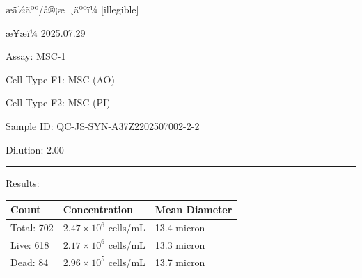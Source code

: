 \documentclass[UTF8,10pt,a4paper,fontset=fandol]{ctexart}
\newcommand{\fieldvalue}[1]{#1}
\newcommand{\handwritten}[1]{#1}
\begin{document}
\begin{center}
\begin{center}
\begin{center}
\vspace{1em}

\hspace{0.03\textwidth}
\end{center}

\vfill

æä½äºº/å®¡æ ¸äººï¼%
\fieldvalue{\handwritten{[illegible]}}

\hfill æ¥æï¼%
\fieldvalue{\handwritten{2025.07.29}}

\newpage

\noindent
Assay: %
\fieldvalue{MSC-1}

\noindent
Cell Type F1: %
\fieldvalue{MSC (AO)}

\noindent
Cell Type F2: %
\fieldvalue{MSC (PI)}

\noindent
Sample ID: %
\fieldvalue{QC-JS-SYN-A37Z2202507002-2-2}

\noindent
Dilution: %
\fieldvalue{2.00}

\medskip
\noindent\rule{\textwidth}{0.4pt}

\noindent
Results:

\medskip
\noindent
\begin{tabularx}{\textwidth}{@{}lXX@{}}
Count & Concentration & Mean Diameter \\
\hline
Total: %
\fieldvalue{702}
&
\fieldvalue{$2.47\times10^{6}$ cells/mL}
&
\fieldvalue{13.4 micron}
\\
Live: %
\fieldvalue{618}
&
\fieldvalue{$2.17\times10^{6}$ cells/mL}
&
\fieldvalue{13.3 micron}
\\
Dead: %
\fieldvalue{84}
&
\fieldvalue{$2.96\times10^{5}$ cells/mL}
&
\fieldvalue{13.7 micron}
\end{tabularx}


\end{center}
\end{center}
\end{document}
